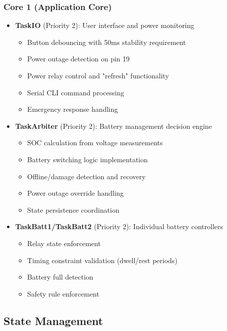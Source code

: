\documentclass[11pt,a4paper]{article}
\begin{document}
\subsubsection{Core 1 (Application Core)}
\begin{itemize}
    \item \textbf{TaskIO} (Priority 2): User interface and power monitoring
    \begin{itemize}
        \item Button debouncing with 50ms stability requirement
        \item Power outage detection on pin 19
        \item Power relay control and "refresh" functionality
        \item Serial CLI command processing
        \item Emergency response handling
    \end{itemize}
    
    \item \textbf{TaskArbiter} (Priority 2): Battery management decision engine
    \begin{itemize}
        \item SOC calculation from voltage measurements
        \item Battery switching logic implementation
        \item Offline/damage detection and recovery
        \item Power outage override handling
        \item State persistence coordination
    \end{itemize}
    
    \item \textbf{TaskBatt1/TaskBatt2} (Priority 2): Individual battery controllers
    \begin{itemize}
        \item Relay state enforcement
        \item Timing constraint validation (dwell/rest periods)
        \item Battery full detection
        \item Safety rule enforcement
    \end{itemize}
\end{itemize}

\subsection{State Management}
\end{document}
